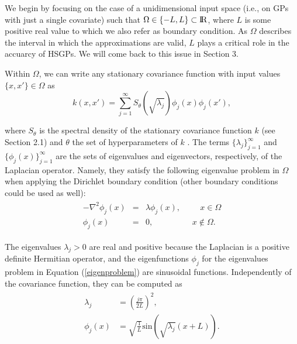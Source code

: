 \documentclass[]{interact}
\theoremstyle{plain}%
\theoremstyle{definition}
\theoremstyle{remark}
\begin{document}
We begin by focusing on the case of a unidimensional input space (i.e., on GPs with just a single covariate) such that $\Omega \in \{-L,L\} \subset {\rm I\!R}$, where $L$ is some positive real value to which we also refer as boundary condition. As $\Omega$ describes the interval in which the approximations are valid, $L$ plays a critical role in the accuarcy of HSGPs. We will come back to this issue in Section 3.

Within $\Omega$, we can write any stationary covariance function with input values $\{x,x'\} \in \Omega$ as 
%
\begin{equation}\label{approxcov}
k(x,x') = \sum_{j=1}^\infty S_{\theta}(\sqrt{\lambda_j}) \phi_j(x) \phi_j(x'),
\end{equation} 

\noindent where $S_{\theta}$ is the spectral density of the stationary covariance function $k$ (see Section 2.1) and $\theta$ the set of hyperparameters of $k$ \citep{rasmussen2006gaussian}. The terms $\{\lambda_j\}_{j=1}^{\infty}$ and $\{\phi_j(x)\}_{j=1}^{\infty}$ are the sets of eigenvalues and eigenvectors, respectively, of the Laplacian operator. Namely, they satisfy the following eigenvalue problem in $\Omega$ when applying the Dirichlet boundary condition (other boundary conditions could be used as well):
%
\begin{eqnarray}\label{eigenproblem}
\begin{split}
-\nabla^2 \phi_j(x)&=&\lambda \phi_j(x), \hspace{1cm}  x \in \Omega \\ 
\phi_j(x)&=&0, \hspace{2cm} x \notin \Omega.
\end{split}
\end{eqnarray} 

\noindent The eigenvalues $\lambda_j>0$ are real and positive because the Laplacian is a positive definite Hermitian operator, and the eigenfunctions $\phi_j$ for the eigenvalues problem in Equation (\ref{eigenproblem}) are sinusoidal functions. Independently of the covariance function, they can be computed as
%
\begin{eqnarray}\label{bf&lambda}
\begin{split}
\lambda_j&=\left(\frac{j\pi}{2L}\right)^2, \\
\phi_j(x)&=\sqrt{\frac{1}{L}} \text{sin}\left(\sqrt{\lambda_j}(x+L)\right).
\end{split}
\end{eqnarray}
\end{document}
